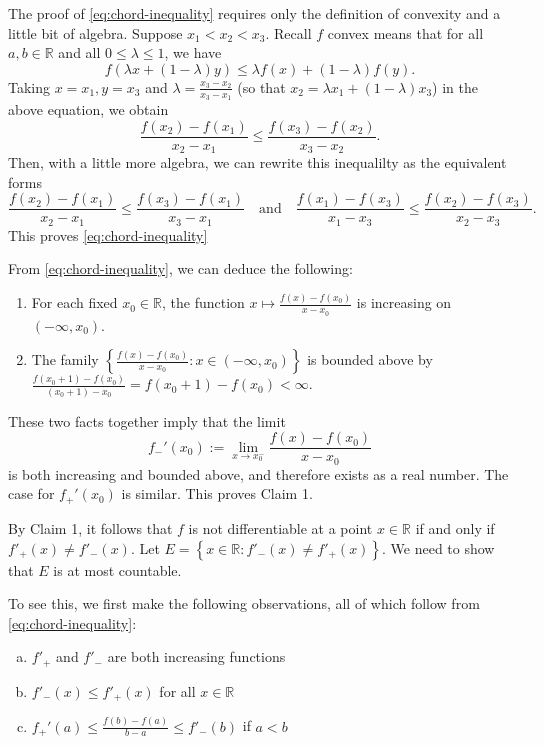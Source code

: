 \documentclass{exam}
\theoremstyle{problemstyle}
\newcommand{\1}[1]{\textbf{1}_{\left[#1\right]}} %
\def\R{\mathbb{R}} %
\begin{document}
\begin{questions}
\begin{solution}
The proof of \eqref{eq:chord-inequality} requires only the definition of convexity and a little bit of algebra.  Suppose $x_{1}<x_{2}<x_{3}$. Recall $f$ convex means that for all $a,b\in \R$ and all $0\leq \lambda\leq 1$, we have
  \begin{equation*}
    f(\lambda x + (1-\lambda)y)\leq \lambda f(x) + (1-\lambda)f(y).
  \end{equation*}
  Taking $x=x_{1}, y=x_{3}$ and $\lambda=\frac{x_{3}-x_{2}}{x_{3}-x_{1}}$ (so that $x_{2}= \lambda x_{1} + (1-\lambda)x_{3}$) in the above equation, we obtain 
\begin{equation*}
  \frac{f(x_{2})-f(x_{1})}{x_{2}-x_{1}}\leq \frac{f(x_{3})-f(x_{2})}{x_{3}-x_{2}}.
\end{equation*}
Then, with a little more algebra, we can rewrite this inequalilty as the equivalent forms
\begin{equation*}
  \frac{f(x_{2})-f(x_{1})}{x_{2}-x_{1}}\leq \frac{f(x_{3})-f(x_{1})}{x_{3}-x_{1}} \quad \text{and}\quad \frac{f(x_{1})-f(x_{3})}{x_{1}-x_{3}}\leq \frac{f(x_{2})-f(x_{3})}{x_{2}-x_{3}}.
\end{equation*}
This proves \eqref{eq:chord-inequality}

From \eqref{eq:chord-inequality}, we can deduce the following:
\begin{enumerate}
\item For each fixed $x_{0}\in \R$, the function $x\mapsto \frac{f(x)-f(x_{0})}{x-x_{0}}$ is increasing on $(-\infty,x_{0})$.
\item The family $\left\{   \frac{f(x)-f(x_{0})}{x-x_{0}}:  x\in (-\infty,x_{0})\right\}$ is bounded above by $\frac{f(x_{0}+1)-f(x_{0})}{(x_{0}+1)-x_{0}} = f(x_{0}+1)-f(x_{0})<\infty$.
\end{enumerate}
These two facts together imply that the limit
\begin{equation*}
  f_{-}'(x_{0}):=\lim_{x\to x_{0}^{-}}\frac{f(x)-f(x_{0})}{x-x_{0}}
\end{equation*}
is both increasing and bounded above, and therefore exists as a real number. The case for $f_{+}'(x_{0})$ is similar. This proves Claim 1.



By Claim 1, it follows that $f$ is not differentiable at a point $x\in \R$ if and only if $f'_{+}(x)\neq f'_{-}(x)$. Let $E=\left\{ x\in \R : f'_{-}(x)\neq f'_{+}(x) \right\}$. We need to show that $E$ is at most countable.


To see this, we first make the following observations, all of which follow from \eqref{eq:chord-inequality}:
\begin{enumerate}[(a)]
\item \label{item:3} $f'_{+}$ and $f'_{-}$ are both increasing functions
\item \label{item:5} $f'_{-}(x)\leq f'_{+}(x)$ for all $x\in\R$
\item \label{item:4} $f_{+}'(a) \leq \frac{f(b)-f(a)}{b-a}\leq f'_{-}(b)$ if $a<b$
\end{enumerate}


\end{solution}
\end{questions}
\end{document}
